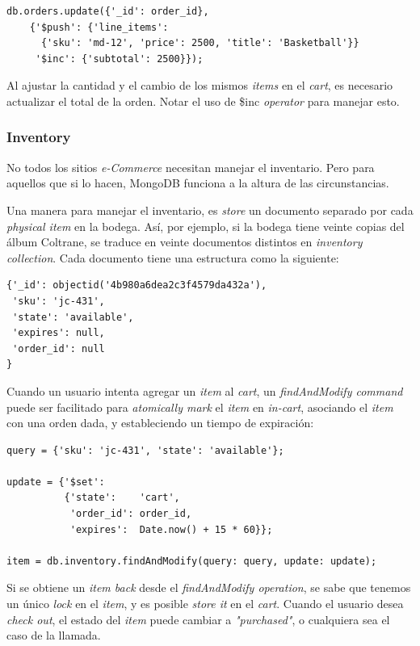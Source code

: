 \begin{lstlisting}[caption= Ejemplo de \textit{atomic operation}.]
	db.orders.update({'_id': order_id},
    {'$push': {'line_items':
      {'sku': 'md-12', 'price': 2500, 'title': 'Basketball'}}
     '$inc': {'subtotal': 2500}});
\end{lstlisting}

Al ajustar la cantidad y el cambio de los mismos \textit{items} en el \textit{cart}, es necesario actualizar el total de la orden. Notar el uso de \$inc \textit{operator} para manejar esto.

\subsubsection{Inventory}

No todos los sitios \textit{e-Commerce} necesitan manejar el inventario. Pero para aquellos que si lo hacen, MongoDB funciona a la altura de las circunstancias.

Una manera para manejar el inventario, es \textit{store} un documento separado por cada \textit{physical item} en la bodega. Así, por ejemplo, si la bodega tiene veinte copias del álbum Coltrane, se traduce en veinte documentos distintos en \textit{inventory collection}. Cada documento tiene una estructura como la siguiente:

\begin{lstlisting}[caption= Ejemplo de \textit{atomic operation}.]
	{'_id': objectid('4b980a6dea2c3f4579da432a'),
 'sku': 'jc-431',
 'state': 'available',
 'expires': null,
 'order_id': null
}
\end{lstlisting}


Cuando un usuario intenta agregar un \textit{item} al \textit{cart}, un \textit{findAndModify command} puede ser facilitado para \textit{atomically mark} el \textit{item} en \textit{in-cart}, asociando el \textit{item} con una orden dada, y estableciendo un tiempo de expiración:

\begin{lstlisting}[caption= Ejemplo de \textit{atomic operation}.]
	query = {'sku': 'jc-431', 'state': 'available'};

update = {'$set':
          {'state':    'cart',
           'order_id': order_id,
           'expires':  Date.now() + 15 * 60}};

item = db.inventory.findAndModify(query: query, update: update);
\end{lstlisting}

Si se obtiene un \textit{item back} desde el \textit{findAndModify operation}, se sabe que tenemos un único \textit{lock} en el \textit{item}, y es posible \textit{store it} en el \textit{cart}. Cuando el usuario desea \textit{check out}, el estado del \textit{item} puede cambiar a \textit{"purchased"}, o cualquiera sea el caso de la llamada.

